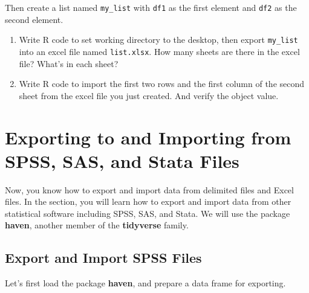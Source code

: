 \documentclass[
]{book}
\begin{document}
Then create a list named \texttt{my\_list} with \texttt{df1} as the first element and \texttt{df2} as the second element.

\begin{enumerate}
\def\labelenumi{\arabic{enumi}.}
\item
  Write R code to set working directory to the desktop, then export \texttt{my\_list} into an excel file named \texttt{list.xlsx}. How many sheets are there in the excel file? What's in each sheet?
\item
  Write R code to import the first two rows and the first column of the second sheet from the excel file you just created. And verify the object value.
\end{enumerate}

\hypertarget{import-other}{%
\section{Exporting to and Importing from SPSS, SAS, and Stata Files}\label{import-other}}

Now, you know how to export and import data from delimited files and Excel files. In the section, you will learn how to export and import data from other statistical software including SPSS, SAS, and Stata. We will use the package \textbf{haven}, another member of the \textbf{tidyverse} family.

\hypertarget{export-and-import-spss-files}{%
\subsection{Export and Import SPSS Files}\label{export-and-import-spss-files}}

Let's first load the package \textbf{haven}, and prepare a data frame for exporting.
\end{document}

